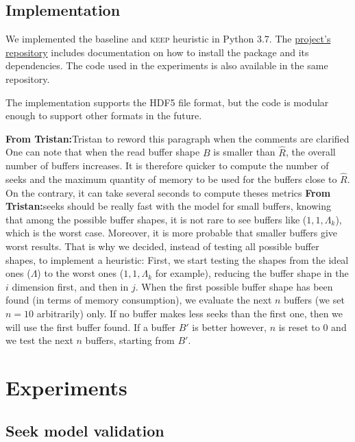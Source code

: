 \documentclass[sigconf, nonacm]{acmart}
\newcommand{\tristan}[1]{\color{orange}\textbf{From Tristan:}#1\color{black}}
\newcommand{\keep}[0]{\textsc{keep}\xspace}
\begin{document}
\subsection{Implementation}

We implemented the baseline and \keep heuristic in Python 3.7. The
\href{https://github.com/big-data-lab-team/repartition_experiments}{project's
repository} includes documentation on
how to install the package and its dependencies. The code used in the
experiments is also available in the same repository.

The implementation supports the HDF5 file format, but the code is modular
enough to support other formats in the future.

\tristan{Tristan to reword this paragraph when the comments are clarified}
One can note that when the read buffer shape $B$ is smaller than $\hat R$,
the overall number of buffers increases.
It is therefore quicker to compute the number of seeks and the maximum
quantity of memory to be used for the buffers close to $\hat R$.
On the contrary, it can take several seconds to compute theses metrics \tristan{seeks should be really fast with the model} for
small buffers, knowing that among the possible buffer shapes, it is not rare to
see buffers like ($1,1,\Lambda_k$), which is the worst case.
Moreover, it is more probable that smaller buffers give worst results.
That is why we decided, instead of testing all possible buffer shapes, to implement a heuristic:
First, we start testing the shapes from the ideal ones ($\Lambda$) to the worst ones
($1,1,\Lambda_k$ for example), reducing the buffer shape in the $i$ dimension
first, and then in $j$.
When the first possible buffer shape has been found (in terms of memory consumption),
we evaluate the next $n$ buffers (we set $n=10$ arbitrarily) only.
If no buffer makes less seeks than the first one, then we will use the first buffer found.
If a buffer $B'$ is better however, $n$ is reset to 0 and we test the next $n$
buffers, starting from $B'$.

\section{Experiments}
\label{sec:experiments}
\subsection{Seek model validation}
\end{document}
